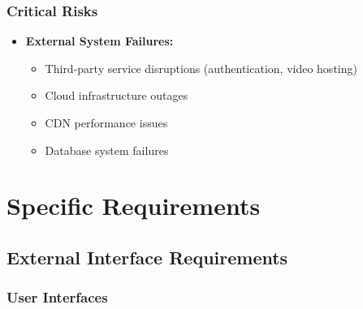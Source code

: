 \documentclass[a4paper, 11pt]{scrreprt}
\begin{document}
\subsection{Critical Risks}
\begin{itemize}
    \item \textbf{External System Failures:}
        \begin{itemize}
            \item Third-party service disruptions (authentication, video hosting)
            \item Cloud infrastructure outages
            \item CDN performance issues
            \item Database system failures
        \end{itemize}
\end{itemize}


\chapter{Specific Requirements}

\section{External Interface Requirements}
\subsection{User Interfaces}
\end{document}
